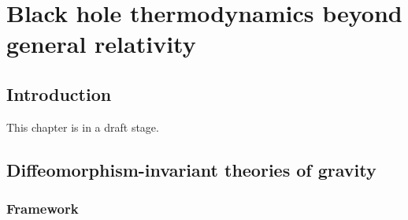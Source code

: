 \chapter{Black hole thermodynamics beyond general relativity}
\label{s:tha}

\minitoc

\section{Introduction}

This chapter is in a draft stage.


\section{Diffeomorphism-invariant theories of gravity}

\subsection{Framework} \label{s:tha:framework}

